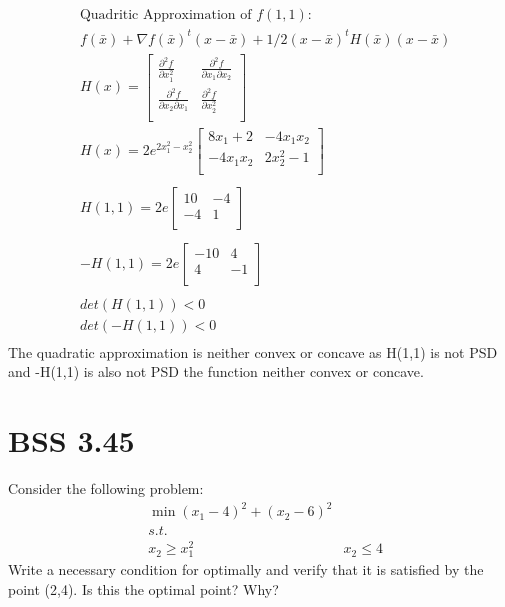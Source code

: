 \documentclass[12pt]{article}
\begin{document}
    \begin{align*}
        &\text{Quadritic Approximation of } f(1,1): \\ 
        &f(\bar x) + \nabla f(\bar x)^t (x-\bar x) + 1/2 (x-\bar x)^t H(\bar x) (x-\bar x)\\ 
        &H(x) = 
        \begin{bmatrix}
          \frac{\partial^2 f}{\partial x_1^2} & \frac{\partial^2 f}{\partial x_1 \partial x_2} \\
          \frac{\partial^2 f}{\partial x_2 \partial x_1} & \frac{\partial^2 f}{\partial x_2^2} \\
        \end{bmatrix} \\
        &H(x) = 2e^{2x_1^2 -x_2^2}
        \begin{bmatrix}
            8x_1 + 2 & -4x_1x_2\\
            -4x_1x_2 & 2x_2^2-1\\
        \end{bmatrix} \\ \\
         &H(1,1) = 2e
        \begin{bmatrix}
            10 & -4\\
            -4 & 1\\
        \end{bmatrix} \\ \\
         &-H(1,1) = 2e
        \begin{bmatrix}
            -10 & 4\\
            4 & -1\\
        \end{bmatrix} \\ \\
        & det(H(1,1)) < 0\\
        & det(-H(1,1)) < 0 \\
    \end{align*}
The quadratic approximation is neither convex or concave as H(1,1) is not PSD and -H(1,1) is also not PSD the function neither convex or concave.
\section{BSS 3.45} 
Consider the following problem:
    \begin{align*}
        &\min (x_1 -4)^2 + (x_2 -6 )^2\\
        &s.t.\\
        &x_2 \geq x_1^2
        &x_2 \leq 4
    \end{align*}
Write a necessary condition for optimally and verify that it is satisfied by the point (2,4). Is this the optimal point? Why?\\
\end{document}
